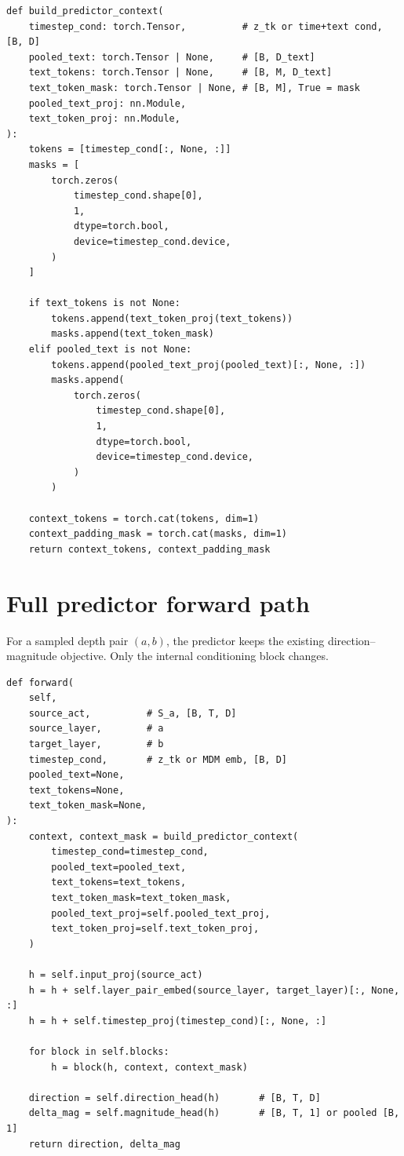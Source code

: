 \documentclass[11pt]{article}
\begin{document}
\begin{lstlisting}[style=python]
def build_predictor_context(
    timestep_cond: torch.Tensor,          # z_tk or time+text cond, [B, D]
    pooled_text: torch.Tensor | None,     # [B, D_text]
    text_tokens: torch.Tensor | None,     # [B, M, D_text]
    text_token_mask: torch.Tensor | None, # [B, M], True = mask
    pooled_text_proj: nn.Module,
    text_token_proj: nn.Module,
):
    tokens = [timestep_cond[:, None, :]]
    masks = [
        torch.zeros(
            timestep_cond.shape[0],
            1,
            dtype=torch.bool,
            device=timestep_cond.device,
        )
    ]

    if text_tokens is not None:
        tokens.append(text_token_proj(text_tokens))
        masks.append(text_token_mask)
    elif pooled_text is not None:
        tokens.append(pooled_text_proj(pooled_text)[:, None, :])
        masks.append(
            torch.zeros(
                timestep_cond.shape[0],
                1,
                dtype=torch.bool,
                device=timestep_cond.device,
            )
        )

    context_tokens = torch.cat(tokens, dim=1)
    context_padding_mask = torch.cat(masks, dim=1)
    return context_tokens, context_padding_mask
\end{lstlisting}

\section{Full predictor forward path}

For a sampled depth pair $(a,b)$, the predictor keeps the existing
direction--magnitude objective. Only the internal conditioning block changes.

\begin{lstlisting}[style=python]
def forward(
    self,
    source_act,          # S_a, [B, T, D]
    source_layer,        # a
    target_layer,        # b
    timestep_cond,       # z_tk or MDM emb, [B, D]
    pooled_text=None,
    text_tokens=None,
    text_token_mask=None,
):
    context, context_mask = build_predictor_context(
        timestep_cond=timestep_cond,
        pooled_text=pooled_text,
        text_tokens=text_tokens,
        text_token_mask=text_token_mask,
        pooled_text_proj=self.pooled_text_proj,
        text_token_proj=self.text_token_proj,
    )

    h = self.input_proj(source_act)
    h = h + self.layer_pair_embed(source_layer, target_layer)[:, None, :]
    h = h + self.timestep_proj(timestep_cond)[:, None, :]

    for block in self.blocks:
        h = block(h, context, context_mask)

    direction = self.direction_head(h)       # [B, T, D]
    delta_mag = self.magnitude_head(h)       # [B, T, 1] or pooled [B, 1]
    return direction, delta_mag
\end{lstlisting}
\end{document}
